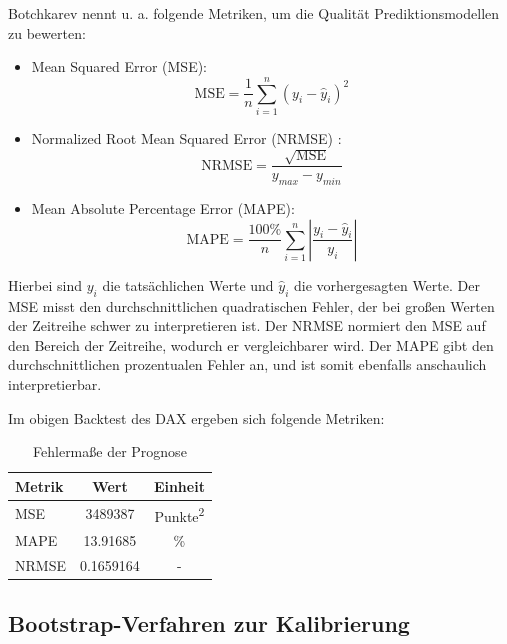 \begin{lemma}
Botchkarev \cite{botchkarev_performance_2019} nennt u. a. folgende Metriken, um die Qualität Prediktionsmodellen zu bewerten:
\begin{itemize}
    \item Mean Squared Error (MSE): $$\text{MSE} = \frac{1}{n} \sum_{i=1}^n (y_i - \hat{y}_i)^2$$
    \item Normalized Root Mean Squared Error (NRMSE) : $$\text{NRMSE} = \frac{\sqrt{\text{MSE}}}{y_{max} - y_{min}}$$
    \item Mean Absolute Percentage Error (MAPE): $$\text{MAPE} = \frac{100\%}{n} \sum_{i=1}^n \left|\frac{y_i - \hat{y}_i}{y_i}\right|$$
\end{itemize}

Hierbei sind $y_i$ die tatsächlichen Werte und $\hat{y}_i$ die vorhergesagten Werte.
Der MSE misst den durchschnittlichen quadratischen Fehler, der bei großen Werten der Zeitreihe schwer 
zu interpretieren ist. Der NRMSE normiert den MSE auf den Bereich der Zeitreihe,
wodurch er vergleichbarer wird. Der MAPE gibt den durchschnittlichen prozentualen Fehler an, und ist
somit ebenfalls anschaulich interpretierbar.

\end{lemma}

\begin{lemma}
Im obigen Backtest des DAX ergeben sich folgende Metriken:

\begin{table}[h]
    \centering
    \begin{tabular}{lcc}
        \toprule
        Metrik & Wert & Einheit \\
        \midrule
        MSE    & 3489387 & Punkte\textsuperscript{2} \\
        MAPE   & 13.91685   & \% \\
        NRMSE  & 0.1659164 & - \\
        \bottomrule
    \end{tabular}
    \caption{Fehlermaße der Prognose}
    \label{tab:metrics}
\end{table}

\end{lemma}


\subsection{Bootstrap-Verfahren zur Kalibrierung}



